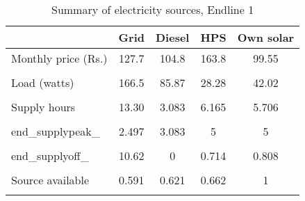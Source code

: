 \begin{table}[htbp]\centering
\caption{Summary of electricity sources, Endline 1}
\begin{tabular}{l*{4}{c}}
\toprule
                &     Grid&   Diesel&      HPS&Own solar\\
\midrule
Monthly price (Rs.)&    127.7&    104.8&    163.8&    99.55\\
                &         &         &         &         \\
\addlinespace
Load (watts)    &    166.5&    85.87&    28.28&    42.02\\
                &         &         &         &         \\
\addlinespace
Supply hours    &    13.30&    3.083&    6.165&    5.706\\
                &         &         &         &         \\
\addlinespace
end\_supplypeak\_ &    2.497&    3.083&        5&        5\\
                &         &         &         &         \\
\addlinespace
end\_supplyoff\_  &    10.62&        0&    0.714&    0.808\\
                &         &         &         &         \\
\addlinespace
Source available&    0.591&    0.621&    0.662&        1\\
                &         &         &         &         \\
\bottomrule
\end{tabular}
\end{table}
